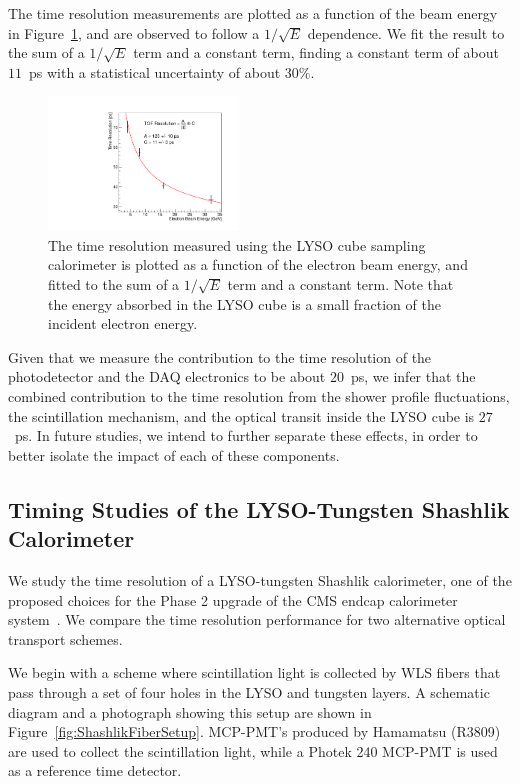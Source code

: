 \documentclass[12pt]{article}
\begin{document}
The time resolution measurements are plotted as a function of the
beam energy in Figure~\ref{fig:LYSOCubeTOFResolutionVsEnergy}, and are observed
to follow a $1/\sqrt{E}$ dependence. We fit the result to the sum of a 
$1/\sqrt{E}$ term and a constant term, finding a constant term of
about $11$~ps with a statistical uncertainty of about $30\%$. 

\begin{figure}[h] \centering
\includegraphics[width=0.45\textwidth]{figs/TimeResolutionVsEnergy_CrystalCube} 
\caption{ The time resolution measured using the LYSO cube
sampling calorimeter is plotted as a function of the electron beam energy, 
and fitted to the sum of a $1/\sqrt{E}$ term and a constant term. Note that the energy absorbed in the LYSO cube is a small fraction of the incident electron energy.}
\label{fig:LYSOCubeTOFResolutionVsEnergy}
\end{figure}

Given that we measure the contribution to the time 
resolution of the photodetector and the DAQ electronics
to be about $20$~ps, we infer that the combined contribution to the time 
resolution from the shower profile fluctuations, the scintillation mechanism,
and the optical transit inside the LYSO cube is $27$~ps. In future studies, we intend 
to further separate these effects, in order to better isolate the impact 
of each of these components.

\subsection{Timing Studies of the LYSO-Tungsten Shashlik Calorimeter}

We study the time resolution of a LYSO-tungsten Shashlik
calorimeter, one of the proposed choices for the Phase 2 upgrade of the
CMS endcap calorimeter system~\cite{???}. We compare the time resolution
performance for two alternative optical transport schemes. 

We begin with a scheme where scintillation light is collected
by WLS fibers that pass through a set of four holes in
the LYSO and tungsten layers. A schematic diagram and a photograph showing this setup 
are shown in Figure~\ref{fig:ShashlikFiberSetup}. 
MCP-PMT's produced by Hamamatsu (R3809) are used to collect 
the scintillation light, while a Photek 240 MCP-PMT is used as a reference 
time detector. 
\end{document}
